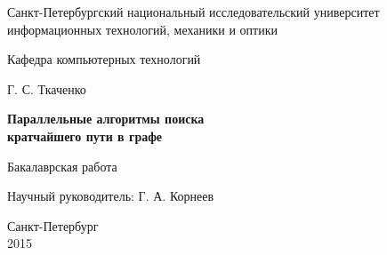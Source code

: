 \documentclass{report}
\theoremstyle{plain}
\theoremstyle{definition}
\numberwithin{theorem}{chapter}        %
\begin{document}
	
	
	
	\initializefrontsections
	
	\pagestyle{title}
	
	\begin{center}
		Санкт-Петербургский национальный исследовательский университет \\ информационных технологий, механики и оптики
		
		\vspace{2cm}
		
		Кафедра компьютерных технологий
		
		\vspace{3cm}
		
		{\Large Г. С. Ткаченко}
		
		\vspace{2cm}
		
		\vbox{\LARGE\bfseries
			Параллельные алгоритмы поиска \\ кратчайшего пути в графе}
		
		\vspace{4cm}
		
		Бакалаврская работа 
		
		\vspace{1cm}
		
		{\Large Научный руководитель: Г. А. Корнеев}
		
		\vspace{5cm}
		
		Санкт-Петербург\\ 2015
	\end{center}
	
	\newpage
	
	\setcounter{page}{4}
	\pagestyle{plain}
	
	
	
	\tableofcontents
	
	
	\def\t#1{\mbox{\texttt{\hbox{#1}}}}
	\def\b#1{\textbf{#1}}
	\def\tb#1{\t{\b{#1}}}
	
	\def\cln#1{\t{#1}}
	\def\pcn#1{\t{#1}}
	\newcommand{\p}{\par Здесь будет текст...}
	
	\def\drawfigure#1#2#3{
		\begin{figure}[ht]
			\centerline{ \texttt{[image: img/\#1]}}
			\caption{#2}
			\label{#3}
		\end{figure}
	}
	\def\drawfigurex#1#2#3#4{
		\begin{figure}[ht]
			\centerline{ \texttt{[image: img/\#1]}}
			\caption{#2}
			\label{#3}
		\end{figure}
	}
	
\end{document}
